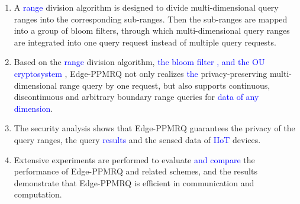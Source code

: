 \documentclass[IEEE JOURNAL OF BIOMEDICAL AND HEALTH INFORMATICS]{IEEEtran}
\begin{document}
	\begin{enumerate}
		\item A \textcolor{blue}{range} division algorithm is designed to divide multi-dimensional query ranges into the corresponding sub-ranges. Then the sub-ranges are mapped into a group of bloom filters, through which  multi-dimensional query ranges are integrated into one query request instead of multiple query requests.
		\item Based on the \textcolor{blue}{range} division algorithm, \textcolor{blue}{the bloom filter \textcolor{blue}{\cite{bloomfilter1970},} and \textcolor{blue}{the OU cryptosystem} \cite{ou1998}}, Edge-PPMRQ not only realizes \textcolor{blue}{the} privacy-preserving multi-dimensional range query by one request, but also supports continuous, discontinuous and arbitrary boundary range queries for
		 \textcolor{blue}{data of any dimension}.
		\item The security analysis shows that Edge-PPMRQ guarantees the privacy of the query ranges, the query \textcolor{blue}{results} and the sensed data of \textcolor{blue}{IIoT} devices.
		\item Extensive experiments are performed to evaluate \textcolor{blue}{and compare} the performance of Edge-PPMRQ and related schemes, and the results demonstrate that Edge-PPMRQ is efficient in communication and computation.	
	\end{enumerate}
\end{document}
